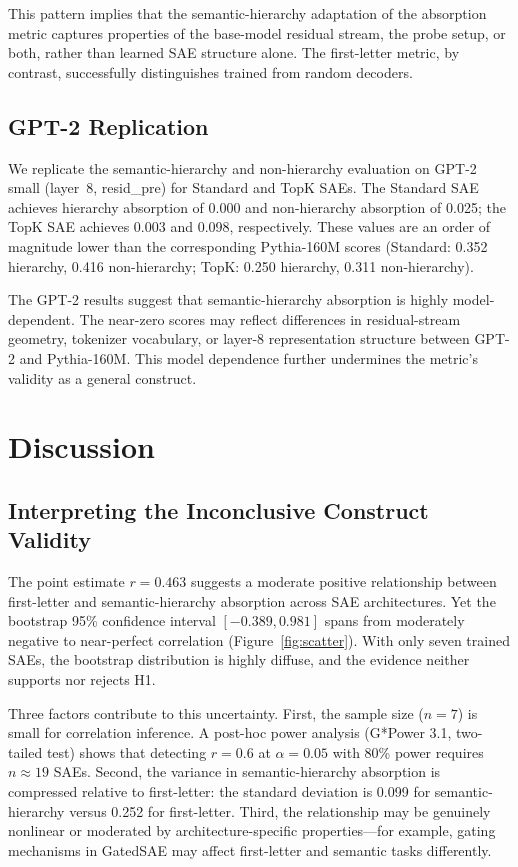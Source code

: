 \documentclass{article}
\begin{document}
This pattern implies that the semantic-hierarchy adaptation of the absorption metric captures properties of the base-model residual stream, the probe setup, or both, rather than learned SAE structure alone. The first-letter metric, by contrast, successfully distinguishes trained from random decoders.

\subsection{GPT-2 Replication}

We replicate the semantic-hierarchy and non-hierarchy evaluation on GPT-2 small (layer~8, resid\_pre) for Standard and TopK SAEs. The Standard SAE achieves hierarchy absorption of 0.000 and non-hierarchy absorption of 0.025; the TopK SAE achieves 0.003 and 0.098, respectively. These values are an order of magnitude lower than the corresponding Pythia-160M scores (Standard: 0.352 hierarchy, 0.416 non-hierarchy; TopK: 0.250 hierarchy, 0.311 non-hierarchy).

The GPT-2 results suggest that semantic-hierarchy absorption is highly model-dependent. The near-zero scores may reflect differences in residual-stream geometry, tokenizer vocabulary, or layer-8 representation structure between GPT-2 and Pythia-160M. This model dependence further undermines the metric's validity as a general construct.

\section{Discussion}

\subsection{Interpreting the Inconclusive Construct Validity}

The point estimate $r = 0.463$ suggests a moderate positive relationship between first-letter and semantic-hierarchy absorption across SAE architectures. Yet the bootstrap 95\% confidence interval $[-0.389, 0.981]$ spans from moderately negative to near-perfect correlation (Figure~\ref{fig:scatter}). With only seven trained SAEs, the bootstrap distribution is highly diffuse, and the evidence neither supports nor rejects H1.

Three factors contribute to this uncertainty. First, the sample size ($n = 7$) is small for correlation inference. A post-hoc power analysis (G*Power 3.1, two-tailed test) shows that detecting $r = 0.6$ at $\alpha = 0.05$ with 80\% power requires $n \approx 19$ SAEs. Second, the variance in semantic-hierarchy absorption is compressed relative to first-letter: the standard deviation is 0.099 for semantic-hierarchy versus 0.252 for first-letter. Third, the relationship may be genuinely nonlinear or moderated by architecture-specific properties---for example, gating mechanisms in GatedSAE may affect first-letter and semantic tasks differently.
\end{document}
